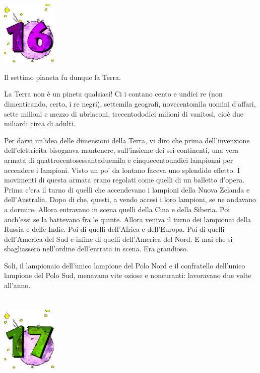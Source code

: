 \documentclass[11pt]{scrbook}
\begin{document}
\chapter{}
\begin{center}
\includegraphics{img/chapter16}
\end{center}

Il settimo pianeta fu dunque la Terra.

La Terra non è un pineta qualsiasi! Ci i contano cento e undici re (non dimenticando, certo, i re negri), settemila geografi, novecentomila uomini d'affari, sette milioni e mezzo di ubriaconi, trecentododici milioni di vanitosi, cioè due miliardi circa di adulti.

Per darvi un'idea delle dimensioni della Terra, vi diro che prima dell'invenzione dell'elettricita bisognava mantenere, sull'insieme dei sei continenti, una vera armata di quattrocentosessantaduemila e cinquecentoundici lampionai per accendere i lampioni. Visto un po' da lontano faceva uno splendido effetto. I movimenti di questa armata erano regolati come quelli di un balletto d'opera. Prima c'era il turno di quelli che accendevano i lampioni della Nuova Zelanda e dell'Australia. Dopo di che, questi, a vendo accesi i loro lampioni, se ne andavano a dormire. Allora entravano in scena quelli della Cina e della Siberia. Poi anch'essi se la battevano fra le quinte. Allora veniva il turno dei lampionai della Russia e delle Indie. Poi di quelli dell'Africa e dell'Europa. Poi di quelli dell'America del Sud e infine di quelli dell'America del Nord. E mai che si sbagliassero nell'ordine dell'entrata in scena. Era grandioso.

Soli, il lampionaio dell'unico lampione del Polo Nord e il confratello dell'unico lampione del Polo Sud, menavano vite oziose e noncuranti: lavoravano due volte all'anno.

\chapter{}
\begin{center}
\includegraphics{img/chapter17}
\end{center}
\end{document}
